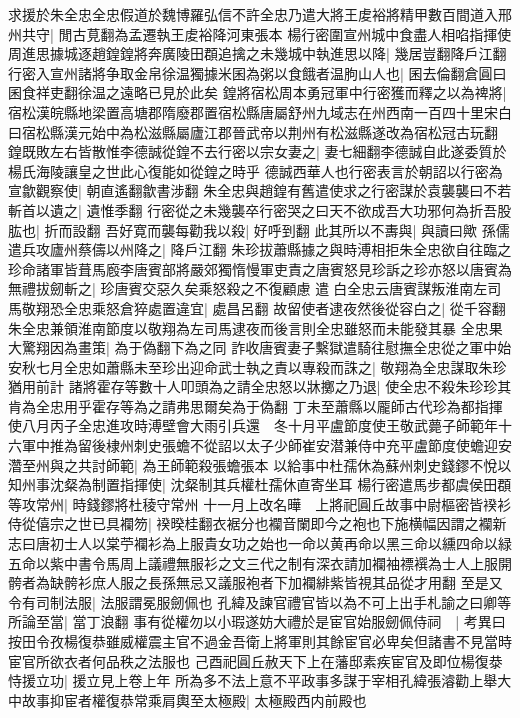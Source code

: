 求援於朱全忠全忠假道於魏博羅弘信不許全忠乃遣大將王䖍裕將精甲數百間道入邢州共守|{
	閒古莧翻為孟遷執王䖍裕降河東張本}
楊行密圍宣州城中食盡人相啗指揮使周進思據城逐趙鍠鍠將奔廣陵田頵追擒之未幾城中執進思以降|{
	幾居豈翻降戶江翻}
行密入宣州諸將争取金帛徐温獨據米囷為粥以食餓者温朐山人也|{
	囷去倫翻倉圓曰囷食祥吏翻徐温之遠略已見於此矣}
鍠將宿松周本勇冠軍中行密獲而釋之以為禆將|{
	宿松漢皖縣地梁置高塘郡隋廢郡置宿松縣唐屬舒州九域志在州西南一百四十里宋白曰宿松縣漢元始中為松滋縣屬廬江郡晉武帝以荆州有松滋縣遂改為宿松冠古玩翻}
鍠既敗左右皆散惟李德誠從鍠不去行密以宗女妻之|{
	妻七細翻李德誠自此遂委質於楊氏海陵讓皇之世此心復能如從鍠之時乎}
德誠西華人也行密表言於朝詔以行密為宣歙觀察使|{
	朝直遙翻歙書涉翻}
朱全忠與趙鍠有舊遣使求之行密謀於袁襲襲曰不若斬首以遺之|{
	遺惟季翻}
行密從之未幾襲卒行密哭之曰天不欲成吾大功邪何為折吾股肱也|{
	折而設翻}
吾好寛而襲每勸我以殺|{
	好呼到翻}
此其所以不夀與|{
	與讀曰歟}
孫儒遣兵攻廬州蔡儔以州降之|{
	降戶江翻}
朱珍拔蕭縣據之與時溥相拒朱全忠欲自往臨之珍命諸軍皆葺馬廏李唐賓部將嚴郊獨惰慢軍吏責之唐賓怒見珍訴之珍亦怒以唐賓為無禮拔劒斬之|{
	珍唐賓交惡久矣乘怒殺之不復顧慮}
遣白全忠云唐賓謀叛淮南左司馬敬翔恐全忠乘怒倉猝處置違宜|{
	處昌呂翻}
故留使者逮夜然後從容白之|{
	從千容翻朱全忠兼領淮南節度以敬翔為左司馬逮夜而後言則全忠雖怒而未能發其暴}
全忠果大驚翔因為畫策|{
	為于偽翻下為之同}
詐收唐賓妻子繫獄遣騎往慰撫全忠從之軍中始安秋七月全忠如蕭縣未至珍出迎命武士執之責以專殺而誅之|{
	敬翔為全忠謀取朱珍猶用前計}
諸將霍存等數十人叩頭為之請全忠怒以牀擲之乃退|{
	使全忠不殺朱珍珍其肯為全忠用乎霍存等為之請弗思爾矣為于偽翻}
丁未至蕭縣以龎師古代珍為都指揮使八月丙子全忠進攻時溥壁會大雨引兵還　冬十月平盧節度使王敬武薨子師範年十六軍中推為留後棣州刺史張蟾不從詔以太子少師崔安潜兼侍中充平盧節度使蟾迎安濳至州與之共討師範|{
	為王師範殺張蟾張本}
以給事中杜孺休為蘇州刺史錢鏐不悅以知州事沈粲為制置指揮使|{
	沈粲制其兵權杜孺休直寄坐耳}
楊行密遣馬步都虞侯田頵等攻常州|{
	時錢鏐將杜稜守常州}
十一月上改名曄　上將祀圓丘故事中尉樞密皆䙆衫侍從僖宗之世已具襴笏|{
	䙆暌桂翻衣裾分也襴音闌即今之袍也下施横幅因謂之襴新志曰唐初士人以棠苧襴衫為上服貴女功之始也一命以黄再命以黑三命以纁四命以緑五命以紫中書令馬周上議禮無服衫之文三代之制有深衣請加襴袖褾襈為士人上服開骻者為缺骻衫庶人服之長孫無忌又議服袍者下加襴緋紫皆視其品從才用翻}
至是又令有司制法服|{
	法服謂冕服劒佩也}
孔緯及諫官禮官皆以為不可上出手札諭之曰卿等所論至當|{
	當丁浪翻}
事有從權勿以小瑕遂妨大禮於是宦官始服劒佩侍祠　|{
	考異曰按田令孜楊復恭雖威權震主官不過金吾衛上將軍則其餘宦官必卑矣但諸書不見當時宦官所欲衣者何品秩之法服也}
己酉祀圓丘赦天下上在藩邸素疾宦官及即位楊復㳟恃援立功|{
	援立見上卷上年}
所為多不法上意不平政事多謀于宰相孔緯張濬勸上舉大中故事抑宦者權復恭常乘肩輿至太極殿|{
	太極殿西内前殿也}
